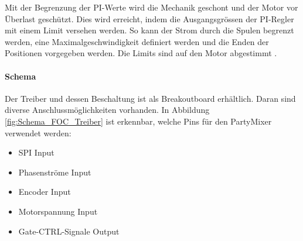 


Mit der Begrenzung der PI-Werte wird die Mechanik geschont und der Motor vor Überlast geschützt. Dies wird erreicht, indem die Ausgangsgrössen der PI-Regler mit einem Limit versehen werden. So kann der Strom durch die Spulen begrenzt werden, eine Maximalgeschwindigkeit definiert werden und die Enden der Positionen vorgegeben werden. Die Limits sind auf den Motor abgestimmt \cite{stahl_simulation_2014}.

\paragraph{Schema}\label{par:Schaltungsaufbau_TMC4671}\mbox{}

Der Treiber und dessen Beschaltung ist als Breakoutboard erhältlich. Daran sind diverse Anschlussmöglichkeiten vorhanden. In Abbildung \ref{fig:Schema_FOC_Treiber} ist erkennbar, welche Pins für den PartyMixer verwendet werden:

\begin{itemize}
\item SPI Input
\item Phasenströme Input
\item Encoder Input
\item Motorspannung Input
\item Gate-CTRL-Signale Output
\end{itemize}

